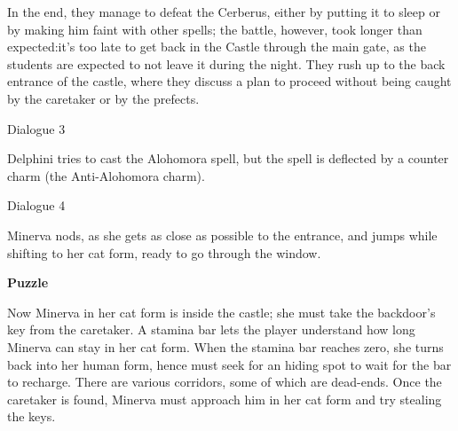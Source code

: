In the end, they manage to defeat the Cerberus, either by putting it to sleep or by making him faint with other spells; the battle, however, took longer than expected:it's too late to get back in the Castle through the main gate, as the students are expected to not leave it during the night. They rush up to the back entrance of the castle, where they discuss a plan to proceed without being caught by the caretaker or by the prefects. 
 
\pagebreak

\begin{dialogue}{Dialogue 3} 
\end{dialogue}

Delphini tries to cast the Alohomora spell, but the spell is deflected by a counter charm (the Anti-Alohomora charm). 


\begin{dialogue}{Dialogue 4} 
\end{dialogue}

Minerva nods, as she gets as close as possible to the entrance, and jumps while shifting to her cat form, ready to go through the window. 

\pagebreak

\textbf{Puzzle}

Now Minerva in her cat form is inside the castle; she must take the backdoor's key from the caretaker. A stamina bar lets the player understand how long Minerva can stay in her cat form. When the stamina bar reaches zero, she turns back into her human form, hence must seek for an hiding spot to wait for the bar to recharge. There are various corridors, some of which are dead-ends. Once the caretaker is found, Minerva must approach him in her cat form and try stealing the keys. 

